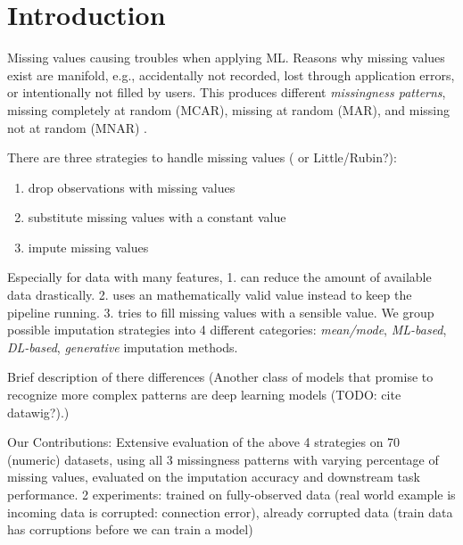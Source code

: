 \section{Introduction}


Missing values causing troubles when applying ML. Reasons why missing values exist are manifold, e.g., accidentally not recorded, lost through application errors, or intentionally not filled by users. This produces different \emph{missingness patterns}, missing completely at random (MCAR), missing at random (MAR), and missing not at random (MNAR) \cite{Buuren}.

There are three strategies to handle missing values (\cite{Buuren} or Little/Rubin?):
\begin{enumerate}
	\item drop observations with missing values
	\item substitute missing values with a constant value
	\item impute missing values
\end{enumerate}

Especially for data with many features, 1. can reduce the amount of available data drastically. 2. uses an mathematically valid value instead to keep the pipeline running. 3. tries to fill missing values with a sensible value. We group possible imputation strategies into 4 different categories: \emph{mean/mode}, \emph{ML-based}, \emph{DL-based}, \emph{generative} imputation methods.

Brief description of there differences
(Another class of models that promise to recognize more complex patterns are deep learning models (TODO: cite datawig?).)

Our Contributions: Extensive evaluation of the above 4 strategies on 70 (numeric) datasets, using all 3 missingness patterns with varying percentage of missing values, evaluated on the imputation accuracy and downstream task performance. 2 experiments: trained on fully-observed data (real world example is incoming data is corrupted: connection error), already corrupted data (train data has corruptions before we can train a model)
